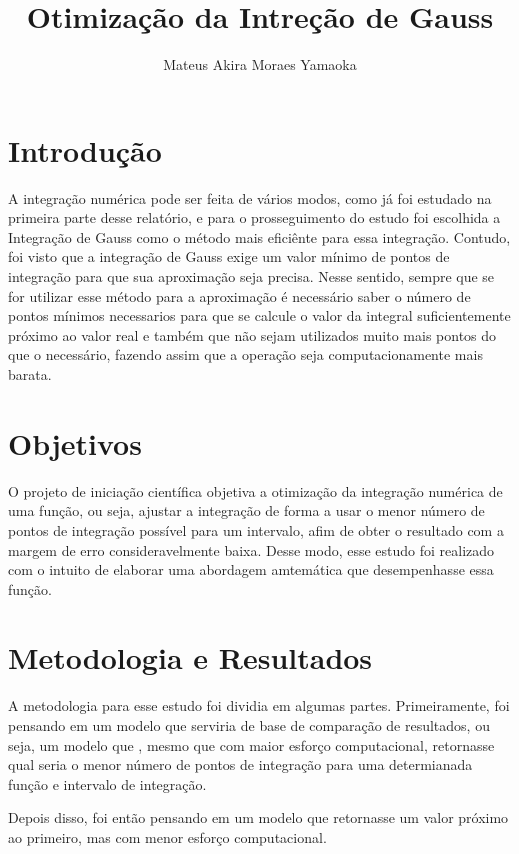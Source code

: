 \documentclass[12pt,a4paper]{article}
\begin{document}
\title{{\Huge \textbf{Otimização da Intreção de Gauss}}}
\author{Mateus Akira Moraes Yamaoka}
\maketitle


\newpage
\section{Introdução}
\qquad A integração numérica pode ser feita de vários modos, como já foi estudado na primeira parte desse relatório, e para o prosseguimento do estudo foi escolhida a Integração de Gauss como o método mais eficiênte para essa integração. Contudo, foi visto que a integração de Gauss exige um valor mínimo de pontos de integração para que sua aproximação seja precisa. Nesse sentido, sempre que se for utilizar esse método para a aproximação é necessário saber o número de pontos mínimos necessarios para que se calcule o valor da integral suficientemente próximo ao valor real e também que não sejam utilizados muito mais pontos do que o necessário, fazendo assim que a operação seja computacionamente mais barata.




\newpage
\section{Objetivos}

\qquad O projeto de iniciação científica objetiva a otimização da integração numérica de uma função, ou seja, ajustar a integração de forma a usar o menor número de pontos de integração possível para um intervalo, afim de obter o resultado com a margem de erro consideravelmente baixa. Desse modo, esse estudo foi realizado com o intuito de elaborar uma abordagem amtemática que desempenhasse essa função.


\newpage
\section{Metodologia e Resultados}
\qquad A metodologia para esse estudo foi dividia em algumas partes. Primeiramente, foi pensando em um modelo que serviria de base de comparação de resultados, ou seja, um modelo que , mesmo que com maior esforço computacional, retornasse qual seria o menor número de pontos de integração para uma determianada função e intervalo de integração.

Depois disso, foi então pensando em um modelo que retornasse um valor próximo ao primeiro, mas com menor esforço computacional.
\end{document}
